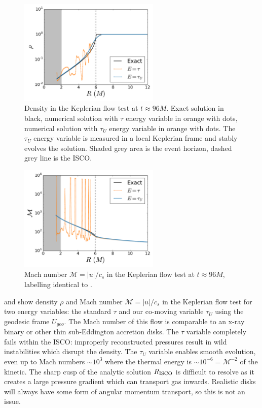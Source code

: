 \begin{figure}
\begin{center}
	\includegraphics[width=0.6\textwidth]{figures/numerics/kep_rho.pdf}
\end{center}
\caption{Density in the Keplerian flow test at $t\approx96M$.  Exact solution in black, numerical solution with $\tau$ energy variable in orange with dots, numerical solution with $\tau_U$ energy variable in orange with dots.  The $\tau_U$ energy variable is measured in a local Keplerian frame and stably evolves the solution.  Shaded grey area is the event horizon, dashed grey line is the ISCO. }
\end{figure}

\begin{figure}
\begin{center}
	\includegraphics[width=0.6\textwidth]{figures/numerics/kep_mach.pdf}
\end{center}
\caption{Mach number $\mathcal{M} = |u|/c_s$ in the Keplerian flow test at $t\approx96M$, labelling identical to .   }
\end{figure}

 and  show density $\rho$ and Mach number $\mathcal{M} = |u|/c_s$ in the Keplerian flow test for two energy variables: the standard $\tau$ and our co-moving variable $\tau_U$ using the geodesic frame $U_{geo}$.  The Mach number of this flow is comparable to an x-ray binary or other thin sub-Eddington accretion disks.  The $\tau$ variable completely fails within the ISCO: improperly reconstructed pressures result in wild instabilities which disrupt the density.  The $\tau_U$ variable enables smooth evolution, even up to Mach numbers $\sim 10^3$ where the thermal energy is $\sim 10^{-6} = \mathcal{M}^{-2}$ of the kinetic.  The sharp cusp of the analytic solution $R_{\rm ISCO}$ is difficult to resolve as it creates a large pressure gradient which can transport gas inwards.  Realistic disks will always have some form of angular momentum transport, so this is not an issue.

